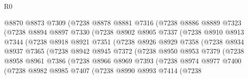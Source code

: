 \begin{lexlean}{R0}
\begin{coremodule}
                    @8870
                    @8873
                    @7309
                    (@7238
                      @8878
                      @8881
                      @7316
                      (@7238
                        @8886
                        @8889
                        @7323
                        (@7238
                          @8894
                          @8897
                          @7330
                          (@7238
                            @8902
                            @8905
                            @7337
                            (@7238
                              @8910
                              @8913
                              @7344
                              (@7238
                                @8918
                                @8921
                                @7351
                                (@7238
                                  @8926
                                  @8929
                                  @7358
                                  (@7238
                                    @8934
                                    @8937
                                    @7365
                                    (@7238
                                      @8942
                                      @8945
                                      @7372
                                      (@7238
                                        @8950
                                        @8953
                                        @7379
                                        (@7238
                                          @8958
                                          @8961
                                          @7386
                                          (@7238
                                            @8966
                                            @8969
                                            @7393
                                            (@7238
                                              @8974
                                              @8977
                                              @7400
                                              (@7238
                                                @8982
                                                @8985
                                                @7407
                                                (@7238
                                                  @8990
                                                  @8993
                                                  @7414
                                                  (@7238

\end{coremodule}
\end{lexlean}
